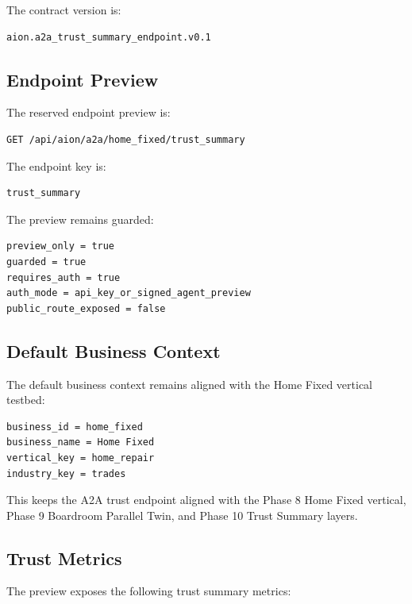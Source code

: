 The contract version is:

\begin{verbatim}
aion.a2a_trust_summary_endpoint.v0.1
\end{verbatim}

\subsection{Endpoint Preview}

The reserved endpoint preview is:

\begin{verbatim}
GET /api/aion/a2a/home_fixed/trust_summary
\end{verbatim}

The endpoint key is:

\begin{verbatim}
trust_summary
\end{verbatim}

The preview remains guarded:

\begin{verbatim}
preview_only = true
guarded = true
requires_auth = true
auth_mode = api_key_or_signed_agent_preview
public_route_exposed = false
\end{verbatim}

\subsection{Default Business Context}

The default business context remains aligned with the Home Fixed vertical testbed:

\begin{verbatim}
business_id = home_fixed
business_name = Home Fixed
vertical_key = home_repair
industry_key = trades
\end{verbatim}

This keeps the A2A trust endpoint aligned with the Phase 8 Home Fixed vertical, Phase 9 Boardroom Parallel Twin, and Phase 10 Trust Summary layers.

\subsection{Trust Metrics}

The preview exposes the following trust summary metrics:

